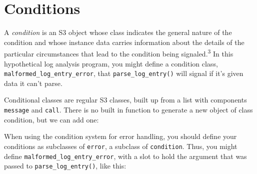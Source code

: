 \hypertarget{conditions}{%
\section{Conditions}\label{conditions}}

A \emph{condition} is an S3 object whose class indicates the general
nature of the condition and whose instance data carries information
about the details of the particular circumstances that lead to the
condition being signaled.\textsuperscript{3} In this hypothetical log
analysis program, you might define a condition class,
\texttt{malformed\_log\_entry\_error}, that \texttt{parse\_log\_entry()}
will signal if it's given data it can't parse.

Conditional classes are regular S3 classes, built up from a list with
components \texttt{message} and \texttt{call}. There is no built in
function to generate a new object of class condition, but we can add
one:

\begin{Shaded}
\begin{Highlighting}[]
\StringTok{ } \NormalTok{(}\OperatorTok{-}
  \NormalTok{(}
     \NormalTok{),}
    \NormalTok{(}
\NormalTok{  )}
\NormalTok{\}}
\end{Highlighting}
\end{Shaded}

When using the condition system for error handling, you should define
your conditions as subclasses of \texttt{error}, a subclass of
\texttt{condition}. Thus, you might define
\texttt{malformed\_log\_entry\_error}, with a slot to hold the argument
that was passed to \texttt{parse\_log\_entry()}, like this:

\begin{Shaded}
\begin{Highlighting}[]
\StringTok{ }
\StringTok{ }\NormalTok{(}
  \NormalTok{(}\NormalTok{(}\NormalTok{, }\NormalTok{),}
\NormalTok{  )}
\NormalTok{\}}
\end{Highlighting}
\end{Shaded}

